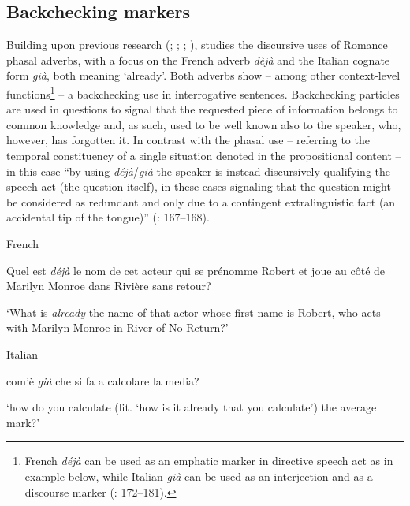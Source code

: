 \subsection{Backchecking markers}
\hypertarget{Toc124860682}{}
Building upon previous research (\citealt{BazzanellaEtAl2005}; \citealt{Hansen2008}; \citealt{HansenStrudsholm2008}; \citealt{Välikangas2004}), \citet{Squartini2013,Squartini2014} studies the discursive uses of Romance phasal adverbs, with a focus on the French adverb \textit{dèjà} and the Italian cognate form \textit{già}, both meaning ‘already’. Both adverbs show – among other context-level functions\footnote{French \textit{déjà} can be used as an emphatic marker in directive speech act as in example  below, while Italian \textit{già} can be used as an interjection and as a discourse marker (\citealt{Squartini2013}: 172–181).} – a backchecking use in interrogative sentences. Backchecking particles are used in questions to signal that the requested piece of information belongs to common knowledge and, as such, used to be well known also to the speaker, who, however, has forgotten it. In contrast with the phasal use – referring to the temporal constituency of a single situation denoted in the propositional content – in this case “by using \textit{déjà}/\textit{già} the speaker is instead discursively qualifying the speech act (the question itself), in these cases signaling that the question might be considered as redundant and only due to a contingent extralinguistic fact (an accidental tip of the tongue)” (\citealt{Squartini2013}: 167–168).

\ea%
    \label{ex:key:97}

          French \citep[195]{Squartini2014}

Quel est \textit{déjà} le nom de cet acteur qui se prénomme Robert et joue au côté de Marilyn Monroe dans Rivière sans retour?

\glt ‘What is \textit{already} the name of that actor whose first name is Robert, who acts with Marilyn Monroe in River of No Return?’
\z %

\ea%
    \label{ex:key:98}

          Italian \citep[200]{Squartini2014}

  com’è \textit{già} che si fa a calcolare la media?

\glt ‘how do you calculate (lit. ‘how is it already that you calculate’) the average mark?’
    \z %

